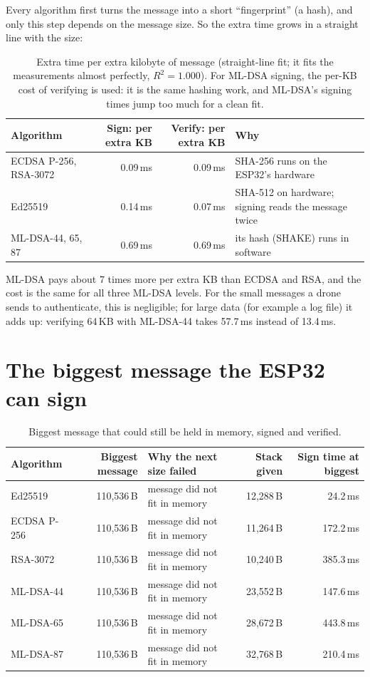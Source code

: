 \documentclass[10pt,a4paper]{article}
\begin{document}
Every algorithm first turns the message into a short ``fingerprint'' (a hash), and only this
step depends on the message size. So the extra time grows in a straight line with the size:

\begin{table}[H]
\centering\small
\begin{tabularx}{0.85\textwidth}{@{}l RR X@{}}
\toprule
Algorithm & Sign: per extra KB & Verify: per extra KB & Why \\
\midrule
ECDSA P-256, RSA-3072 & 0.09\,ms & 0.09\,ms & SHA-256 runs on the ESP32's hardware \\
Ed25519               & 0.14\,ms & 0.07\,ms & SHA-512 on hardware; signing reads the message twice \\
ML-DSA-44, 65, 87     & 0.69\,ms & 0.69\,ms & its hash (SHAKE) runs in software \\
\bottomrule
\end{tabularx}
\caption{Extra time per extra kilobyte of message (straight-line fit; it fits the measurements
almost perfectly, $R^2 = 1.000$). For ML-DSA signing, the per-KB cost of verifying is used: it
is the same hashing work, and ML-DSA's signing times jump too much for a clean fit.}
\end{table}

ML-DSA pays about 7 times more per extra KB than ECDSA and RSA, and the cost is the same for all
three ML-DSA levels. For the small messages a drone sends to authenticate, this is negligible;
for large data (for example a log file) it adds up: verifying 64\,KB with ML-DSA-44 takes
57.7\,ms instead of 13.4\,ms.

\section{The biggest message the ESP32 can sign}

\begin{table}[H]
\centering\small
\begin{tabularx}{\textwidth}{@{}l R X R R@{}}
\toprule
Algorithm & Biggest message & Why the next size failed & Stack given & Sign time at biggest \\
\midrule
Ed25519     & 110,536\,B & message did not fit in memory & 12,288\,B & 24.2\,ms \\
ECDSA P-256 & 110,536\,B & message did not fit in memory & 11,264\,B & 172.2\,ms \\
RSA-3072    & 110,536\,B & message did not fit in memory & 10,240\,B & 385.3\,ms \\
ML-DSA-44   & 110,536\,B & message did not fit in memory & 23,552\,B & 147.6\,ms \\
ML-DSA-65   & 110,536\,B & message did not fit in memory & 28,672\,B & 443.8\,ms \\
ML-DSA-87   & 110,536\,B & message did not fit in memory & 32,768\,B & 210.4\,ms \\
\bottomrule
\end{tabularx}
\caption{Biggest message that could still be held in memory, signed and verified.}
\end{table}
\end{document}
